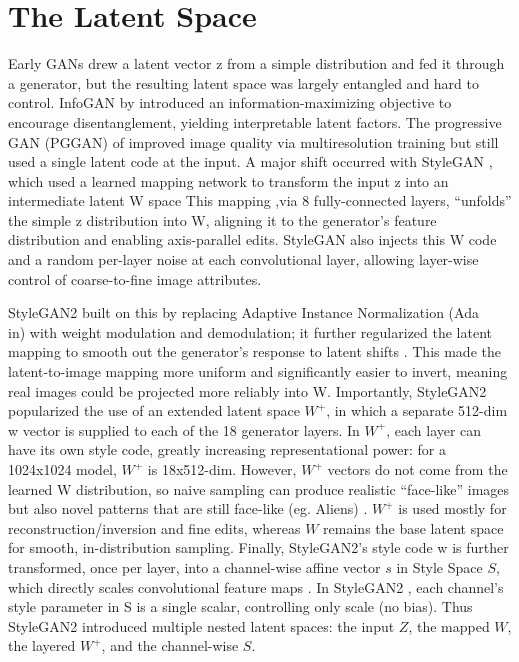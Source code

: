 \section{The Latent Space}

Early GANs drew a latent vector z from a simple distribution and fed it through a generator, but the resulting latent space was largely 
entangled and hard to control. InfoGAN by \citet{chen2016infoganinterpretablerepresentationlearning} introduced an information-maximizing 
objective to encourage disentanglement, yielding interpretable latent factors.
The progressive GAN (PGGAN) of \citet{karras2018progressivegrowinggansimproved} improved image quality via multiresolution training but still used a single latent code at the input. 
A major shift occurred with StyleGAN \citet{karras2019stylebasedgeneratorarchitecturegenerative}, which used a learned mapping network to transform the input z into an intermediate latent W space
This mapping ,via 8 fully-connected layers, “unfolds” the simple z distribution into W, aligning it to the generator's feature distribution and enabling axis-parallel edits\citep{Melnik_2024}.
StyleGAN also injects this W code and a random per-layer noise at each convolutional layer, allowing layer-wise control of coarse-to-fine image attributes.

StyleGAN2 built on this by replacing Adaptive Instance Normalization (Ada\\in) with weight modulation and demodulation; it further regularized the latent mapping to smooth out the generator's response to latent shifts \citep{karras2020analyzingimprovingimagequality}.
This made the latent-to-image mapping more uniform and significantly easier to invert, meaning real images could be projected more reliably into W.
Importantly, StyleGAN2 popularized the use of an extended latent space $W^+$, in which a separate 512-dim w vector is supplied to each of the 18 generator layers.
In $W^+$, each layer can have its own style code, greatly increasing representational power: for a 1024x1024 model, $W^+$ is 18x512-dim.
However, $W^+$ vectors do not come from the learned W distribution, so naive sampling can produce realistic “face-like” images but also novel patterns that are still face-like (eg. Aliens) \citep{Melnik_2024}.
$W^+$ is used mostly for reconstruction/inversion and fine edits, whereas $W$ remains the base latent space for smooth, in-distribution sampling.
Finally, StyleGAN2's style code w is further transformed, once per layer,
into a channel-wise affine vector $s$ in Style Space $S$, which directly scales convolutional feature maps \citep{Melnik_2024}.
In StyleGAN2 , each channel's style parameter in S is a single scalar, controlling only scale (no bias).
Thus StyleGAN2 introduced multiple nested latent spaces: the input $Z$, the mapped $W$, the layered $W^+$, and the channel-wise $S$.


